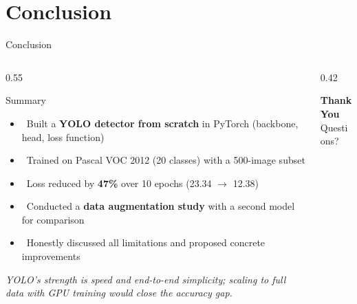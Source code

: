 \documentclass[aspectratio=169, 10pt]{beamer}
\begin{document}
\section{Conclusion}

\begin{frame}{Conclusion}
\begin{columns}[T]
\begin{column}{0.55\textwidth}
  \begin{block}{Summary}
    \begin{itemize}
      \item \checkmark\ Built a \textbf{YOLO detector from scratch}
        in PyTorch (backbone, head, loss function)
      \item \checkmark\ Trained on Pascal VOC 2012 (20 classes)
        with a 500-image subset
      \item \checkmark\ Loss reduced by \textbf{47\%} over 10 epochs
        (23.34 $\to$ 12.38)
      \item \checkmark\ Conducted a \textbf{data augmentation study}
        with a second model for comparison
      \item \checkmark\ Honestly discussed all limitations and
        proposed concrete improvements
    \end{itemize}
  \end{block}

  \vspace{0.1cm}
  \textit{YOLO's strength is speed and end-to-end simplicity; scaling to
  full data with GPU training would close the accuracy gap.}
\end{column}
\begin{column}{0.42\textwidth}
  \begin{center}

    \vspace{0.3cm}
    {\color{aimsblue}\large\bfseries Thank You}\\[2pt]
    {\color{midgray}\large Questions?}
  \end{center}
\end{column}
\end{columns}
\end{frame}
\end{document}
